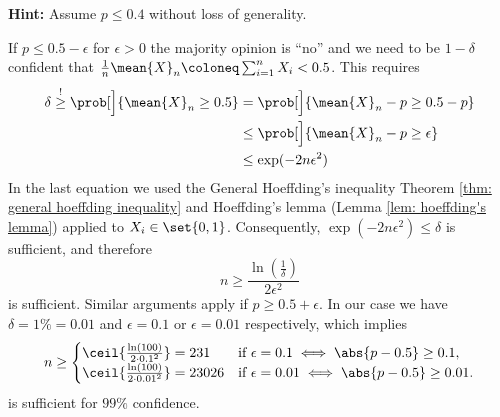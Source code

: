 \begin{exercise}
\begin{enumerate}[label=(\alph*), noitemsep]
        \textbf{Hint:} Assume \(p \le 0.4\) without loss of generality.
        \begin{solution}
            If \(p \le 0.5 - \epsilon\) for \(\epsilon >0\) the majority opinion
            is ``no'' and we need to be \(1-\delta\) confident that \(\frac1n
            \mean{X}_n \coloneq \sum_{i=1}^n X_i < 0.5\). This requires
            \begin{align*}
                \delta \overset{!}\ge \prob[\Big]{\mean{X}_n \ge 0.5}
                &= \prob[\Big]{\mean{X}_n - p \ge 0.5 - p}
                \\
                &\le \prob[\Big]{\mean{X}_n - p \ge \epsilon}
                \\
                &\le \exp(-2n \epsilon^2)
            \end{align*}
            In the last equation we used the General Hoeffding's inequality
            Theorem \ref{thm: general hoeffding inequality} and Hoeffding's
            lemma (Lemma \ref{lem: hoeffding's lemma}) applied to \(X_i \in
            \set{0,1}\).
            Consequently, \(\exp(-2n \epsilon^2) \le \delta\) is sufficient, and therefore
            \[
                n \ge \frac{\ln(\frac1\delta)}{2\epsilon^2}
            \]
            is sufficient.  Similar arguments apply if \(p \ge 0.5 + \epsilon\).
            In our case we
            have \(\delta = 1\% = 0.01\) and \(\epsilon = 0.1\) or \(\epsilon =
            0.01\) respectively, which implies
            \[
                n \ge \begin{cases}
                    \ceil{\frac{\ln(100)}{2 \cdot 0.1^2}} = 231 & \text{if } \epsilon = 0.1 \iff \abs{p-0.5} \ge 0.1,
                    \\
                    \ceil{\frac{\ln(100)}{2 \cdot 0.01^2}} = 23026 & \text{if } \epsilon = 0.01 \iff \abs{p-0.5} \ge 0.01.
                \end{cases}
            \]
            is sufficient for \(99\%\) confidence.
        \end{solution}
    \end{enumerate}
\end{exercise}